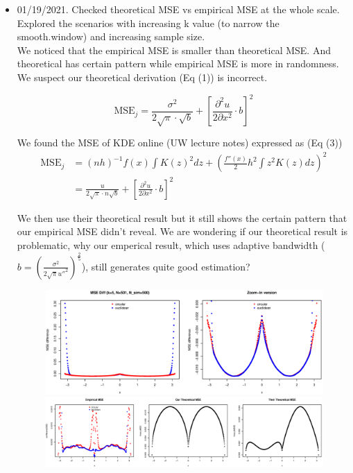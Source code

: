 \documentclass{article}
\begin{document}
\begin{itemize}
\item 01/19/2021. Checked theoretical MSE vs empirical MSE at the whole scale. Explored the scenarios with increasing k value (to narrow the smooth.window) and increasing sample size.\\
We noticed that the empirical MSE is smaller than theoretical MSE. And theoretical has certain pattern while empirical MSE is more in randomness. We suspect our theoretical derivation (Eq (1)) is incorrect. 

\begin{equation}
         \text{MSE}_j=  \frac{\sigma^2}{2\sqrt{\pi} \cdot \sqrt{b}}  + \left[\frac{\partial^2 u}{2\partial x^2}\cdot b \right]^2
\end{equation}

We found the MSE of KDE online (UW lecture notes) expressed as (Eq (3))
\begin{align}
         \text{MSE}_j &= (nh)^{-1}f(x)\int K(z)^2 dz + \left(\frac{f''(x)}{2} h^2 \int z^2K(z)dz \right)^2 \\
         &= \frac{u}{2\sqrt{\pi} \cdot n\sqrt{b}}  + \left[\frac{\partial^2 u}{2\partial x^2}\cdot b \right]^2
\end{align}

We then use their theoretical result but it still shows the certain pattern that our empirical MSE didn't reveal. We are wondering if our theoretical result is problematic, why our emperical result, which uses adaptive bandwidth ($b =\left(\frac{\sigma^2}{2\sqrt{\pi} u''^2}\right)^{\frac{2}{5}} $), still generates quite good estimation?


\begin{figure}[H]
\includegraphics[width=\linewidth]{pic/sim.diff1.eps}
\includegraphics[width=\linewidth]{pic/sim.diff2.eps}
\end{figure}


\end{itemize}
\end{document}
